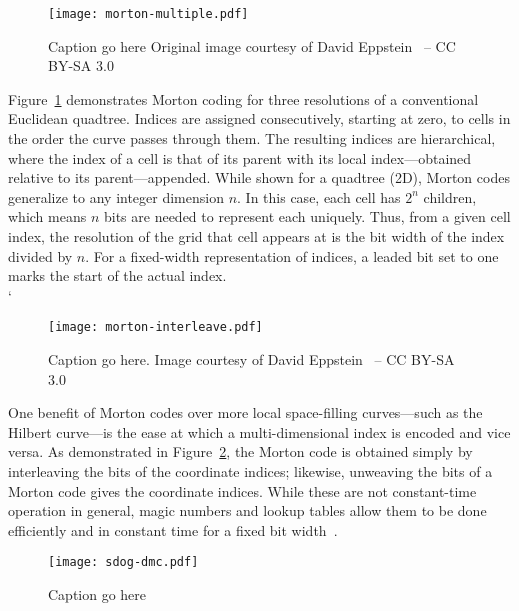 \begin{figure}[htp!]
	\centering
	\texttt{[image: morton-multiple.pdf]}
	\caption[Title]{
		Caption go here
		Original image courtesy of David Eppstein~\cite{morton-multiple} -- CC BY-SA 3.0
	}
	\label{fig:morton-multiple}
\end{figure}


Figure~\ref{fig:morton-multiple} demonstrates Morton coding for three resolutions of a conventional Euclidean quadtree.
Indices are assigned consecutively, starting at zero, to cells in the order the curve passes through them.
The resulting indices are hierarchical, where the index of a cell is that of its parent with its local index---obtained relative to its parent---appended.
While shown for a quadtree (2D), Morton codes generalize to any integer dimension $n$.
In this case, each cell has $2^n$ children, which means $n$ bits are needed to represent each uniquely.
Thus, from a given cell index, the resolution of the grid that cell appears at is the bit width of the index divided by $n$.
For a fixed-width representation of indices, a leaded bit set to one marks the start of the actual index.
\\
`

\begin{figure}[htp!]
	\centering
	\texttt{[image: morton-interleave.pdf]}
	\caption[Title]{
		Caption go here.
		Image courtesy of David Eppstein~\cite{morton-interleave} -- CC BY-SA 3.0
	}
	\label{fig:morton-interleave}
\end{figure}


One benefit of Morton codes over more local space-filling curves---such as the Hilbert curve---is the ease at which a multi-dimensional index is encoded and vice versa.
As demonstrated in Figure~\ref{fig:morton-interleave}, the Morton code is obtained simply by interleaving the bits of the coordinate indices; likewise, unweaving the bits of a Morton code gives the coordinate indices.
While these are not constant-time operation in general, magic numbers and lookup tables allow them to be done efficiently and in constant time for a fixed bit width~\cite{bit twiddle, libmorton}.


\begin{figure}[htp!]
	\centering
	\texttt{[image: sdog-dmc.pdf]}
	\caption[Title]{
		Caption go here
	}
	\label{fig:sdog-dmc}
\end{figure}


